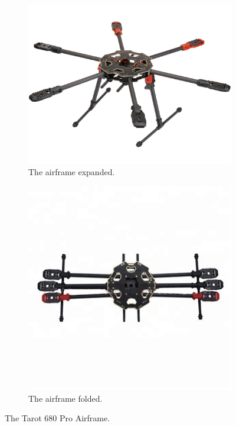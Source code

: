 \begin{itemize}
    \begin{figure}[ht]
        \centering
        \begin{subfigure}[b]{0.3\textwidth}
            \centering
            \includegraphics[width=\textwidth]{images/tarot_680_pro.jpg}
            \caption{The airframe expanded.}
            \label{subfig:tarot_680_pro}
        \end{subfigure}
        \hspace{2cm}
        \begin{subfigure}[b]{0.3\textwidth}
            \centering
            \includegraphics[width=\textwidth]{images/tarot_680_pro_folded.jpg}
            \caption{The airframe folded.}
            \label{subfig:tarot_680_pro_folded}
        \end{subfigure}
        \caption[The Tarot 680 Pro Airframe.]{The Tarot 680 Pro Airframe.\footnotemark}
        \label{fig:tarot_680_pro}
    \end{figure}


\end{itemize}
